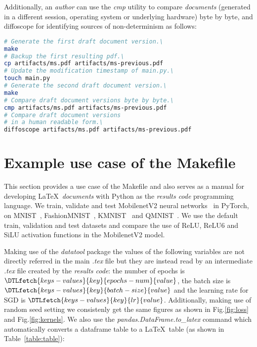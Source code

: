 \documentclass[journal]{IEEEtran}
\begin{document}
Additionally, an \textit{author} can use the \textit{cmp} utility to compare \textit{documents} (generated in a different session, operating system or underlying hardware) byte by byte, and diffoscope for identifying sources of non-determinism as follows:
\begin{lstlisting}[language=bash, style=lststyle, caption={Test draft document version reproducibility. This can also be used as a test script when pushing or pull requesting to a remote repository.}]
# Generate the first draft document version.\ 
make
# Backup the first resulting pdf.\ 
cp artifacts/ms.pdf artifacts/ms-previous.pdf
# Update the modification timestamp of main.py.\ 
touch main.py
# Generate the second draft document version.\ 
make
# Compare draft document versions byte by byte.\ 
cmp artifacts/ms.pdf artifacts/ms-previous.pdf
# Compare draft document versions
# in a human readable form.\ 
diffoscope artifacts/ms.pdf artifacts/ms-previous.pdf
\end{lstlisting}

\section{Example use case of the Makefile}
This section provides a use case of the Makefile and also serves as a manual for developing \LaTeX\ \textit{documents} with Python as the \textit{results code} programming language.
We train, validate and test MobilenetV2 neural networks~\cite{sandler2018mobilenetv2} in PyTorch, on MNIST~\cite{lecun2010mnist}, FashionMNIST~\cite{xiao2017fashion}, KMNIST~\cite{clanuwat2018deep} and QMNIST~\cite{yadav2019cold}.
We use the default train, validation and test datasets and compare the use of ReLU, ReLU6\cite{dahl2013improving} and SiLU\cite{elfwing2018sigmoid} activation functions in the MobilenetV2 model.

Making use of the \textit{datatool} package the values of the following variables are not directly referred in the main \textit{.tex} file but they are instead read by an intermediate \textit{.tex} file created by the \textit{results code}: the number of epochs is $\DTLfetch{keys-values}{key}{epochs-num}{value}$, the batch size is $\DTLfetch{keys-values}{key}{batch-size}{value}$ and the learning rate for SGD is $\DTLfetch{keys-values}{key}{lr}{value}$.
Additionally, making use of random seed setting we consistenly get the same figures as shown in Fig.\ref{fig:loss} and Fig.\ref{fig:kernels}.
We also use the \textit{pandas.DataFrame.to\_latex} command which automatically converts a dataframe table to a \LaTeX\ table (as shown in Table~\ref{table:table}):
\end{document}

